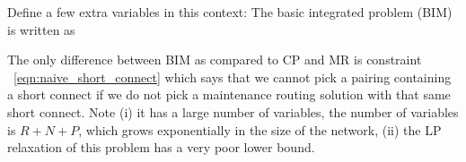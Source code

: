 \documentclass[letterpaper, 10pt, twocolumn, reqno]{amsart}
\begin{document}
Define a few extra variables in this context:
The basic integrated problem (BIM) is written as

The only difference between BIM as compared to CP and MR is constraint ~\eqref{eqn:naive_short_connect} which says that we cannot pick a pairing containing a short connect if we do not pick a maintenance routing solution with that same short connect. Note (i) it has a large number of variables, the number of variables is $R + N+P$, which grows exponentially in the size of the network, (ii) the LP relaxation of this problem has a very poor lower bound.
\end{document}
